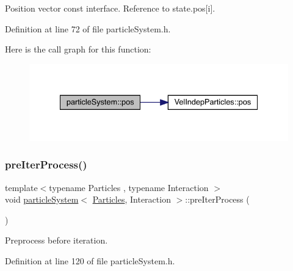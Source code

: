 Position vector const interface. Reference to state.\+pos\mbox{[}i\mbox{]}. 



Definition at line 72 of file particle\+System.\+h.

Here is the call graph for this function\+:\nopagebreak
\begin{figure}[H]
\begin{center}
\leavevmode
\includegraphics[width=334pt]{classparticle_system_ae18ea167d5145d52067ae6661a416c4c_cgraph}
\end{center}
\end{figure}
\mbox{\label{classparticle_system_a14ee76644ab1bacc3ed4a66e4fff0fb1}} 
\subsubsection{\texorpdfstring{pre\+Iter\+Process()}{preIterProcess()}}
{\footnotesize\ttfamily template$<$typename Particles , typename Interaction $>$ \\
void \mbox{\hyperlink{classparticle_system}{particle\+System}}$<$ \mbox{\hyperlink{struct_particles}{Particles}}, Interaction $>$\+::pre\+Iter\+Process (\begin{DoxyParamCaption}{ }\end{DoxyParamCaption})\hspace{0.3cm}{\ttfamily [inline]}}



Preprocess before iteration. 



Definition at line 120 of file particle\+System.\+h.

\mbox{\label{classparticle_system_aed99ea79678f0233119ebc28d2b9822d}} 
